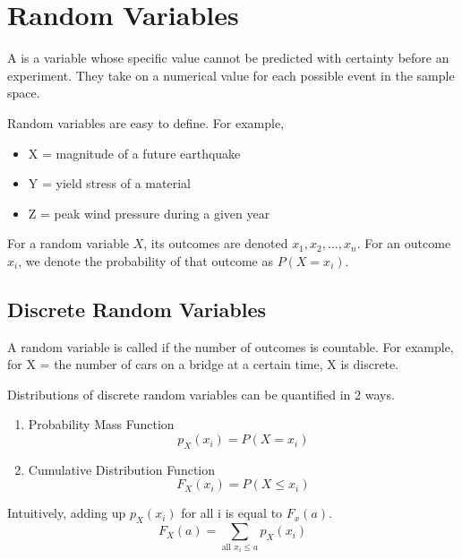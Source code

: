 \chapter{Random Variables}
A  is a variable whose specific value cannot be predicted with certainty before an experiment. They take on a numerical value for each possible event in the sample space.

\begin{example}
    Random variables are easy to define. For example,
    \begin{itemize}
        \item X = magnitude of a future earthquake
        \item Y = yield stress of a material
        \item Z = peak wind pressure during a given year
    \end{itemize}
\end{example}

For a random variable $X$, its outcomes are denoted $x_1, x_2, \ldots, x_n$. For an outcome $x_i$, we denote the probability of that outcome as $P(X = x_i)$.

\section{Discrete Random Variables}
A random variable is called  if the number of outcomes is countable. For example, for X = the number of cars on a bridge at a certain time, X is discrete.

Distributions of discrete random variables can be quantified in 2 ways.
\begin{enumerate}
    \item Probability Mass Function
    \[
        p_X(x_i) = P(X = x_i)
    \]
    \begin{center}
    \end{center}

    \item Cumulative Distribution Function
    \[
        F_X(x_i) = P(X \le x_i)
    \]
    \begin{center}
    \end{center}
\end{enumerate}

Intuitively, adding up $p_X(x_i)$ for all i is equal to $F_x(a)$.
\[
    F_X(a) = \sum_{\text{all } x_i \le a} p_X(x_i)
\]

